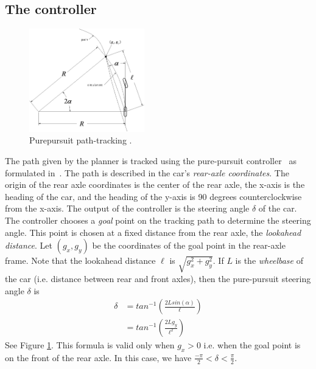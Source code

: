 \subsection{The controller}
\label{sec:ppcontroller}

\begin{figure}
\centering
\includegraphics[width=50mm]{Figures/Purepursuit.png}%
\caption{Purepursuit path-tracking \cite{Snider.2009}.}
\label{fig:purepursuit}%
\end{figure}

The path given by the planner is tracked using the pure-pursuit controller~\cite{Amidi.1991}
as formulated in~\cite{Snider.2009}.
%
The path is described in the car's \emph{rear-axle coordinates}.
%
The origin of the rear axle coordinates is the center of the rear axle, the x-axis is the heading of the car, and the heading of the y-axis is 90 degrees counterclockwise from the x-axis.
%
The output of the controller is the steering angle $\delta$ of the car.
%
The controller chooses a \emph{goal} point on the tracking path to determine the steering angle.
%
This point is chosen at a fixed distance from the rear axle, the \emph{lookahead distance}.
%
Let $(g_x, g_y)$ be the coordinates of the goal point in the rear-axle frame.
%
Note that the lookahead distance $\ell$ is $\sqrt{g_x^2+g_y^2}$.
%
If $L$ is the \emph{wheelbase} of the car (i.e. distance between rear and front axles), then the pure-pursuit steering angle $\delta$ is
\begin{align}
\delta & = tan^{-1}(\frac{2Lsin(\alpha)}{\ell}) \nonumber \\
 & =  tan^{-1}(\frac{2L g_y}{\ell^2})
 \label{eqn:purepursuit}
\end{align}
%
See Figure \ref{fig:purepursuit}.
%
This formula is valid only when $g_x > 0$
i.e. when the goal point is on the front of the rear axle.
%
In this case,
we have $\frac{-\pi}{2} < \delta < \frac{\pi}{2} $.